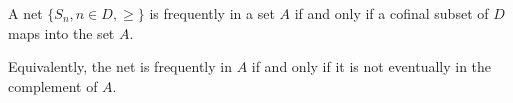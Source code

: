 A net $\{S_n, n \in D, \geq\}$ is frequently in a set $A$ if and only if a cofinal subset of $D$ maps into the set $A$.

Equivalently, the net is frequently in $A$ if and only if it is not eventually in the complement of $A$.
